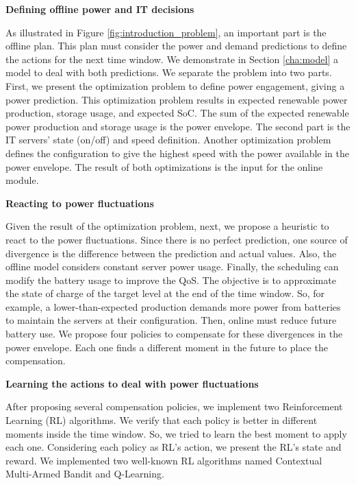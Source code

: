 \begin{center}
    \textbf{Defining offline power and IT decisions}
\end{center}
As illustrated in Figure \ref{fig:introduction_problem}, an important part is the offline plan. This plan must consider the power and demand predictions to define the actions for the next time window. We demonstrate in Section \ref{cha:model} a model to deal with both predictions. We separate the problem into two parts. First, we present the optimization problem to define power engagement, giving a power prediction. This optimization problem results in expected renewable power production, storage usage, and expected SoC. The sum of the expected renewable power production and storage usage is the power envelope. The second part is the IT servers' state (on/off) and speed definition. Another optimization problem defines the configuration to give the highest speed with the power available in the power envelope. The result of both optimizations is the input for the online module.

\begin{center}
    \textbf{Reacting to power fluctuations}
\end{center}
Given the result of the optimization problem, next, we propose a heuristic to react to the power fluctuations. Since there is no perfect prediction, one source of divergence is the difference between the prediction and actual values. Also, the offline model considers constant server power usage. Finally, the scheduling can modify the battery usage to improve the QoS. The objective is to approximate the state of charge of the target level at the end of the time window. So, for example, a lower-than-expected production demands more power from batteries to maintain the servers at their configuration. Then, online must reduce future battery use. We propose four policies to compensate for these divergences in the power envelope. Each one finds a different moment in the future to place the compensation. 

\begin{center}
    \textbf{Learning the actions to deal with power fluctuations}
\end{center}
After proposing several compensation policies, we implement two Reinforcement Learning (RL) algorithms. We verify that each policy is better in different moments inside the time window. So, we tried to learn the best moment to apply each one. Considering each policy as RL's action, we present the RL's state and reward. We implemented two well-known RL algorithms named Contextual Multi-Armed Bandit and Q-Learning. 

